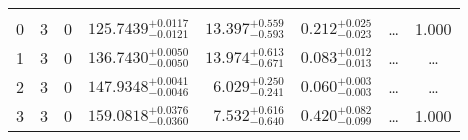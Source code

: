 \begin{table*}[!]
\begin{tabular}{llcrrlrc}
\hline \\[-8pt]
0 & 3 & 0 & $    125.7439_{-      0.0121}^{+      0.0117}$ & $      13.397_{-       0.593}^{+       0.559}$ & $       0.212_{-       0.023}^{+       0.025}$ & \multicolumn{1}{c}{\dots} & 1.000 \\[1pt]
1 & 3 & 0 & $    136.7430_{-      0.0050}^{+      0.0050}$ & $      13.974_{-       0.671}^{+       0.613}$ & $       0.083_{-       0.013}^{+       0.012}$ & \multicolumn{1}{c}{\dots} & \dots \\[1pt]
2 & 3 & 0 & $    147.9348_{-      0.0046}^{+      0.0041}$ & $       6.029_{-       0.241}^{+       0.250}$ & $       0.060_{-       0.003}^{+       0.003}$ & \multicolumn{1}{c}{\dots} & \dots \\[1pt]
3 & 3 & 0 & $    159.0818_{-      0.0360}^{+      0.0376}$ & $       7.532_{-       0.640}^{+       0.616}$ & $       0.420_{-       0.099}^{+       0.082}$ & \multicolumn{1}{c}{\dots} & 1.000\\[1pt]
\hline
\end{tabular}
\end{table*}